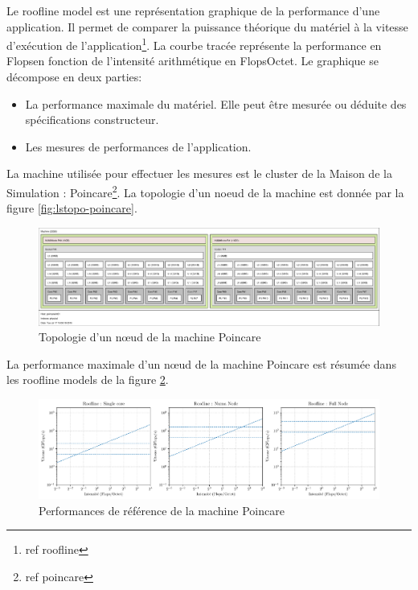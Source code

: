 Le roofline model est une représentation graphique de la performance d'une application. Il permet de comparer la puissance théorique du matériel à la vitesse d'exécution de l'application\footnote{ref roofline}. La courbe tracée représente la performance en Flops\per\second en fonction de l'intensité arithmétique en Flops\per Octet. Le graphique se décompose en deux parties:
\begin{itemize}
	\item La performance maximale du matériel. Elle peut être mesurée ou déduite des spécifications constructeur.
	\item Les mesures de performances de l'application.
\end{itemize}

La machine utilisée pour effectuer les mesures est le cluster de la Maison de la Simulation : Poincare\footnote{ref poincare}. La topologie d'un noeud de la machine est donnée par la figure \ref{fig:lstopo-poincare}.

\begin{figure}
	\centering
	\includegraphics[width=\textwidth]{img/lstopo_poincare}
	\caption{Topologie d'un nœud de la machine Poincare}
	\label{fig:roofline_poincare}
\end{figure}

La performance maximale d'un nœud de la machine Poincare est résumée dans les roofline models de la figure \ref{fig:roofline_poincare}. 

\begin{figure}
	\includegraphics[width=\textwidth]{img/bench_mesh_roofline_limits}
	\caption{Performances de référence de la machine Poincare}
	\label{fig:roofline_poincare}
\end{figure}

